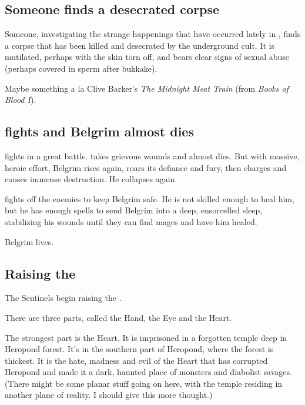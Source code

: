 \subsection{Someone finds a desecrated corpse}
Someone, investigating the strange happenings that have occurred lately in \Redce, finds a corpse that has been killed and desecrated by the underground cult. It is mutilated, perhaps with the skin torn off, and bears clear signs of sexual abuse (perhaps covered in sperm after bukkake). 

Maybe something a la Clive Barker's \emph{The Midnight Meat Train} (from \emph{Books of Blood I}). 









\subsection{\Narkiza{} fights and Belgrim almost dies}
 fights in a great battle.  takes grievous wounds and almost dies. But with massive, heroic effort, Belgrim rises again, roars its defiance and fury, then charges and causes immense destruction. He collapses again. 

\Narkiza{} fights off the enemies to keep Belgrim safe. He is not skilled enough to heal him, but he has enough spells to send Belgrim into a deep, ensorcelled sleep, stabilizing his wounds until they can find mages and have him healed. 

Belgrim lives.









\subsection{Raising the \Haskelek}
The Sentinels begin raising the \Haskelek. 

There are three parts, called the Hand, the Eye and the Heart. 

The strongest part is the Heart. It is imprisoned in a forgotten temple deep in Heropond forest. It's in the southern part of Heropond, where the forest is thickest. It is the hate, madness and evil of the \Haskelek{} Heart that has corrupted Heropond and made it a dark, haunted place of monsters and diabolist savages. (There might be some planar stuff going on here, with the temple residing in another plane of reality. I should give this more thought.) 

